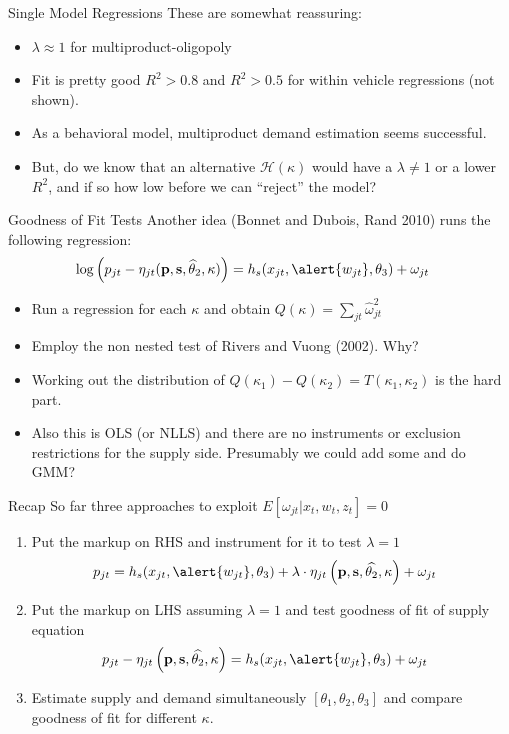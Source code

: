\documentclass[xcolor=pdftex,dvipsnames,table,mathserif,aspectratio=169]{beamer}
\begin{document}
\begin{frame}{Single Model Regressions}
These are somewhat reassuring:
\begin{itemize}
\item $\lambda\approx 1$ for multiproduct-oligopoly
\item Fit is pretty good $R^2 > 0.8$ and $R^2 > 0.5$ for within vehicle regressions (not shown).
\item As a behavioral model, multiproduct demand estimation seems successful.
\item But, do we know that an alternative $\mathcal{H}(\kappa)$ would have a $\lambda \neq 1$ or a lower $R^2$, and if so how low before we can ``reject'' the model?
\end{itemize}
\end{frame}

\begin{frame}{Goodness of Fit Tests}
Another idea (Bonnet and Dubois, Rand 2010) runs the following regression:
\begin{align*}
\log \left( p_{jt} - \eta_{jt}(\mathbf{p},\mathbf{s},\widehat{\theta}_2,\kappa) \right) &= h_s(x_{jt}, \alert{w_{jt}},\theta_3) + \omega_{jt}
\end{align*}
\begin{itemize}
\item Run a regression for each $\kappa$ and obtain $Q(\kappa)=\sum_{jt} \widehat{\omega}_{jt}^2$
\item Employ the \alert{non nested test} of Rivers and Vuong (2002). Why?
\item Working out the distribution of $Q(\kappa_1) - Q(\kappa_2)=T(\kappa_1,\kappa_2)$ is the hard part.
\item Also this is OLS (or NLLS) and there are no instruments or \alert{exclusion restrictions} for the supply side. Presumably we could add some and do GMM?
\end{itemize}
\end{frame}

\begin{frame}{Recap}
\small
So far three approaches to exploit $ E[\omega_{jt} | x_{t},w_{t},z_{t}]=0$
\begin{enumerate}
\item Put the markup on RHS and instrument for it to test $\lambda=1$
\begin{align*}
 p_{jt} &= h_s(x_{jt}, \alert{w_{jt}},\theta_3) + \lambda \cdot \eta_{jt}\left(\mathbf{p},\mathbf{s},\widehat{\theta_2},\kappa \right)+  \omega_{jt}
\end{align*}
\item Put the markup on LHS assuming $\lambda=1$ and test goodness of fit of supply equation
\begin{align*}
 p_{jt} -\eta_{jt}\left(\mathbf{p},\mathbf{s},\widehat{\theta_2},\kappa \right)&= h_s(x_{jt}, \alert{w_{jt}},\theta_3) +  \omega_{jt}
\end{align*}
\item Estimate supply and demand simultaneously $[\theta_1,\theta_2,\theta_3]$ and compare goodness of fit for different $\kappa$.
\end{enumerate}

\end{frame}
\end{document}
